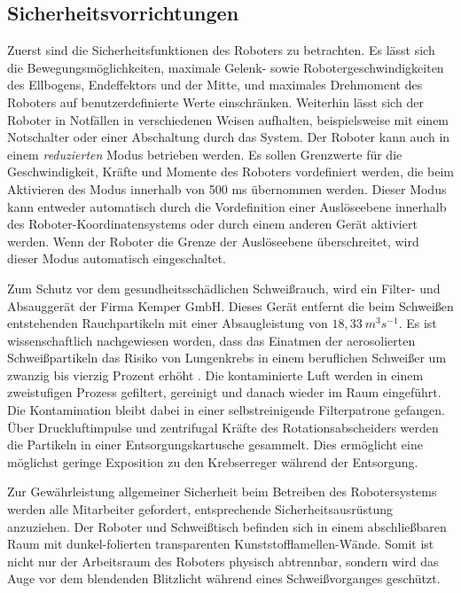 \subsection{Sicherheitsvorrichtungen}
Zuerst sind die Sicherheitsfunktionen des Roboters zu betrachten. Es lässt sich die Bewegungsmöglichkeiten, maximale Gelenk- sowie Robotergeschwindigkeiten des Ellbogens, Endeffektors und der Mitte, und  maximales Drehmoment des Roboters auf benutzerdefinierte Werte einschränken. Weiterhin lässt sich der Roboter in Notfällen in verschiedenen Weisen aufhalten, beispielsweise mit einem Notschalter oder einer Abschaltung durch das System. Der Roboter kann auch in einem \emph{reduzierten} Modus betrieben werden. Es sollen Grenzwerte für die Geschwindigkeit, Kräfte und Momente des Roboters vordefiniert werden, die beim Aktivieren des Modus innerhalb von 500 ms übernommen werden. Dieser Modus kann entweder automatisch durch die Vordefinition einer Auslöseebene innerhalb des Roboter-Koordinatensystems oder durch einem anderen Gerät aktiviert werden. Wenn der Roboter die Grenze der Auslöseebene überschreitet, wird dieser Modus automatisch eingeschaltet. 

Zum Schutz vor dem gesundheitsschädlichen Schweißrauch, wird ein Filter- und Absauggerät der Firma Kemper GmbH. Dieses Gerät entfernt die beim Schweißen entstehenden Rauchpartikeln mit einer Absaugleistung von $18,33\ m^3s^{-1}$. Es ist wissenschaftlich nachgewiesen worden, dass das Einatmen der aerosolierten Schweißpartikeln das Risiko von Lungenkrebs in einem beruflichen Schweißer um zwanzig bis vierzig Prozent erhöht \autocite{Health_and_safety_2011}. Die kontaminierte Luft werden in einem zweistufigen Prozess gefiltert, gereinigt und danach wieder im Raum eingeführt. Die Kontamination bleibt dabei in einer selbstreinigende Filterpatrone gefangen. Über Druckluftimpulse und zentrifugal Kräfte des Rotationsabscheiders werden die Partikeln in einer Entsorgungskartusche gesammelt. Dies ermöglicht eine möglichst geringe Exposition zu den Krebserreger während der Entsorgung. 

Zur Gewährleistung allgemeiner Sicherheit beim Betreiben des Robotersystems werden alle Mitarbeiter gefordert, entsprechende Sicherheitsausrüstung anzuziehen. Der Roboter und Schweißtisch befinden sich in einem abschließbaren Raum mit dunkel-folierten transparenten Kunststofflamellen-Wände. Somit ist nicht nur der Arbeitsraum des Roboters physisch abtrennbar, sondern wird das Auge vor dem blendenden Blitzlicht während eines Schweißvorganges geschützt.

